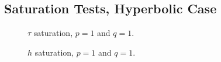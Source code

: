 \newpage
\subsection{Saturation Tests, Hyperbolic Case} \label{sec:saturation_2}


\vspace*{\fill}
\begin{figure}[!ht]
    \centering
    \begin{subfigure}[t]{0.32\textwidth}
        \centering
        
    \end{subfigure}
    \hfill
    \begin{subfigure}[t]{0.32\textwidth}
        \centering
        
    \end{subfigure}
    \hfill
    \begin{subfigure}[t]{0.32\textwidth}
        \centering
        
    \end{subfigure}
    \caption{$\tau$ saturation, $p = 1$ and $q = 1$.}
\end{figure}


\begin{figure}[!ht]
    \centering
    \begin{subfigure}[t]{0.32\textwidth}
        \centering
        
    \end{subfigure}
    \hfill
    \begin{subfigure}[t]{0.32\textwidth}
        \centering
        
    \end{subfigure}
    \hfill
    \begin{subfigure}[t]{0.32\textwidth}
        \centering
        
    \end{subfigure}
    \caption{$h$ saturation, $p = 1$ and $q = 1$.}
\end{figure}
\vspace*{\fill}

